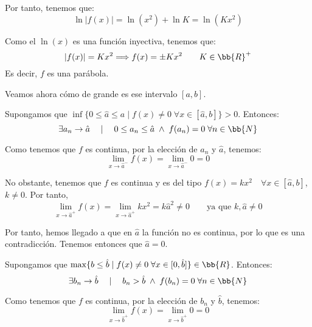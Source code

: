 \begin{ejercicio}
\begin{itemize}
        Por tanto, tenemos que:
        \begin{equation*}
            \ln|f(x)| = \ln(x^2) + \ln K = \ln (Kx^2)
        \end{equation*}

        Como el $\ln(x)$ es una función inyectiva, tenemos que:
        \begin{equation*}
            |f(x)|=Kx^2 \Longrightarrow f(x)=\pm Kx^2 \qquad K\in \bb{R}^+
        \end{equation*}
        Es decir, $f$ es una parábola.

        Veamos ahora cómo de grande es ese intervalo $[a,b]$.
        
        Supongamos que $\inf\{0\leq \hat{a} \leq a \mid f(x)\neq 0 \;\forall x\in [\hat{a},b]\}>0$. Entonces:
        \begin{equation*}
            \exists a_n\to \hat{a} \quad \mid \quad 0\leq a_n\leq \hat{a} \;\land\;f(a_n)=0\;\forall n\in \bb{N}
        \end{equation*}

        Como tenemos que $f$ es continua, por la elección de $a_n$ y $\hat{a}$, tenemos:
        \begin{equation*}
            \lim_{x\to \hat{a}^-} f(x) = \lim_{x\to \hat{a}^-} 0 = 0
        \end{equation*}

        No obstante, tenemos que $f$ es continua y es del tipo $f(x)=kx^2\quad \forall x\in [\hat{a},b]$, $k\neq 0$. Por tanto,
        \begin{equation*}
            \lim_{x\to \hat{a}^+} f(x)= \lim_{x\to \hat{a}^+} kx^2 = k\hat{a}^2 \neq 0 \qquad \text{ya que }k,\hat{a}\neq 0
        \end{equation*}
        

        Por tanto, hemos llegado a que en $\hat{a}$ la función no es continua, por lo que es una contradicción. Tenemos entonces que $\hat{a}=0$.


        Supongamos que $\max \{b\leq \hat{b} \mid f(x)\neq 0 \;\forall x\in [0,\hat{b}]\}\in \bb{R}$.
        Entonces:
        \begin{equation*}
            \exists b_n\to \hat{b} \quad \mid \quad b_n> \hat{b} \;\land\;f(b_n)=0\;\forall n\in \bb{N}
        \end{equation*}

        Como tenemos que $f$ es continua, por la elección de $b_n$ y $\hat{b}$, tenemos:
        \begin{equation*}
            \lim_{x\to \hat{b}^+} f(x) = \lim_{x\to \hat{b}^+} 0 = 0
        \end{equation*}


\end{itemize}
\end{ejercicio}
